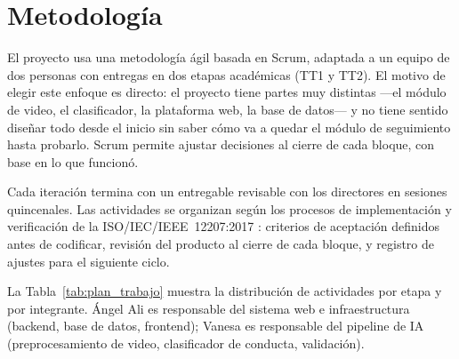 \section{Metodología}

El proyecto usa una metodología ágil basada en Scrum, adaptada a un equipo de dos
personas con entregas en dos etapas académicas (TT1 y TT2). El motivo de elegir este
enfoque es directo: el proyecto tiene partes muy distintas ---el módulo de video, el
clasificador, la plataforma web, la base de datos--- y no tiene sentido diseñar todo
desde el inicio sin saber cómo va a quedar el módulo de seguimiento hasta probarlo.
Scrum permite ajustar decisiones al cierre de cada bloque, con base en lo que funcionó.

Cada iteración termina con un entregable revisable con los directores en sesiones
quincenales. Las actividades se organizan según los procesos de implementación y
verificación de la ISO/IEC/IEEE~12207:2017 \cite{iso12207}: criterios de aceptación
definidos antes de codificar, revisión del producto al cierre de cada bloque, y
registro de ajustes para el siguiente ciclo.

La Tabla~\ref{tab:plan_trabajo} muestra la distribución de actividades por etapa y por
integrante. Ángel Ali es responsable del sistema web e infraestructura (backend, base
de datos, frontend); Vanesa es responsable del pipeline de IA (preprocesamiento de
video, clasificador de conducta, validación).

